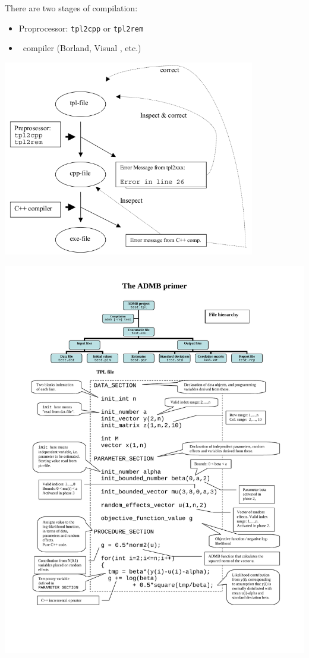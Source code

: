 \documentclass{admbmanual}
\begin{document}
\noindent There are two stages of compilation:
\begin{itemize}
  \item Proprocessor: \texttt{tpl2cpp} or \texttt{tpl2rem}
  \item \cplus\ compiler (Borland, Visual \cplus, etc.)
\end{itemize}
\begin{center}
\includegraphics[width=11cm]{compiling-diagram.png}
\end{center}



\hskip-2pc\includegraphics[width=18cm]{ADMBprim.pdf}%


 



\printindex
\end{document}

